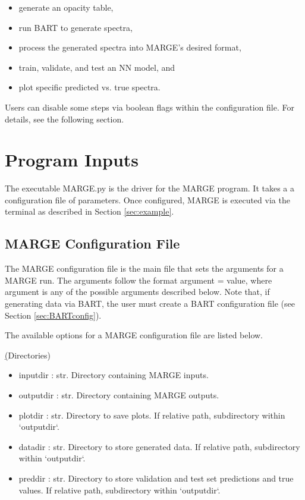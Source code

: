 \documentclass[letterpaper, 12pt]{article}
\begin{document}
\begin{itemize}
\item generate an opacity table,
\item run BART to generate spectra,
\item process the generated spectra into MARGE's desired format,
\item train, validate, and test an NN model, and
\item plot specific predicted vs. true spectra.
\end{itemize}

\noindent Users can disable some steps via boolean flags within the configuration file.  
For details, see the following section.










\section{Program Inputs}
\label{sec:inputs}

The executable MARGE.py is the driver for the MARGE program. It takes a 
a configuration file of parameters.  Once configured, MARGE is executed via 
the terminal as described in Section \ref{sec:example}.


\subsection{MARGE Configuration File}
\label{sec:config}
The MARGE configuration file is the main file that sets the arguments for a 
MARGE run. The arguments follow the format {\ttb argument = value}, where 
{\ttb argument} is any of the possible arguments described below. Note that, 
if generating data via BART, the user must create a BART configuration file 
(see Section \ref{sec:BARTconfig}).

\noindent The available options for a MARGE configuration file are listed below.

\noindent \underline(Directories)
\begin{itemize}
\item inputdir   : str.  Directory containing MARGE inputs.
\item outputdir  : str.  Directory containing MARGE outputs.
\item plotdir    : str.  Directory to save plots. 
                         If relative path, subdirectory within `outputdir`.
\item datadir    : str.  Directory to store generated data. 
                         If relative path, subdirectory within `outputdir`.
\item preddir    : str.  Directory to store validation and test set predictions and true values. 
                         If relative path, subdirectory within `outputdir`.
\end{itemize}
\end{document}

